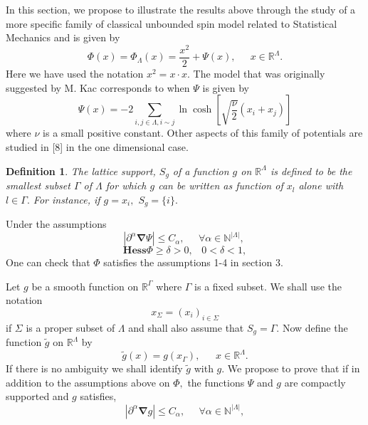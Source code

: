 \documentclass{article}
\newtheorem{definition}[theorem]{Definition}
\begin{document}
In this section, we propose to illustrate the results above through the
study of a more specific family of classical unbounded spin model related to
Statistical Mechanics and is given by%
\begin{equation}
\Phi (x)=\Phi _{\Lambda }(x)=\frac{x^{2}}{2}+\Psi (x),\;\ \ \ \ \;x\in 
\mathbb{R}^{\Lambda }.
\end{equation}%
Here we have used the notation $x^{2}=x\cdot x.$\newline
The model that was originally suggested by M. Kac corresponds to when $\Psi $
is given by%
\begin{equation*}
\Psi (x)=-2\sum_{i,j\in \Lambda ,i\sim j}\ln \cosh \left[ \sqrt{\frac{\nu }{2%
}}\left( x_{i}+x_{j}\right) \right]
\end{equation*}%
where $\nu $ is a small positive constant.\newline
Other aspects of this family of potentials are studied in [8] in the one
dimensional case.

\begin{definition}
The lattice support, $S_{g}$ of a function $g$ on $\mathbb{R}^{\Lambda }$ is
defined to be the smallest subset $\Gamma $ of $\Lambda $ for which $g$ can
be written as function of $x_{l}$ alone with $l\in \Gamma .$ For instance,
if $g=x_{i},$ $S_{g}=\{i\}.$
\end{definition}

Under the assumptions 
\begin{equation}
\left| \partial ^{\alpha }\mathbf{\nabla }\Psi \right| \leq C_{\alpha },\;\
\ \ \ \ \forall \alpha \in \mathbb{N}^{\left| \Lambda \right| },\ 
\end{equation}%
\begin{equation}
\mathbf{Hess}\Phi \geq \delta >0,\;\;\;0<\delta <1,
\end{equation}%
One can check that $\Phi $ satisfies the assumptions 1-4 in section 3.

Let $g$ be a smooth function on $\mathbb{R}^{\Gamma }$ where $\Gamma $ is a
fixed subset. We shall use the notation 
\begin{equation*}
x_{\Sigma }=\left( x_{i}\right) _{i\in \Sigma }
\end{equation*}%
if $\Sigma $ is a proper subset of $\Lambda $ and shall also assume that $%
S_{g}=\Gamma .$ Now define the function $\tilde{g}$ on $\mathbb{R}^{\Lambda
} $ by 
\begin{equation*}
\tilde{g}(x)=g(x_{\Gamma }),\ \ \ \ \ \ \ x\in \mathbb{R}^{\Lambda }.
\end{equation*}%
If there is no ambiguity we shall identify $\tilde{g}$ with $g.$\newline
We propose to prove that if in addition to the assumptions above on $\Phi ,$
the functions $\Psi $ and $g$ are compactly supported and $g$ satisfies,%
\begin{equation*}
\left| \partial ^{\alpha }\mathbf{\nabla }g\right| \leq C_{\alpha },\;\ \ \
\ \ \forall \alpha \in \mathbb{N}^{\left| \Lambda \right| },
\end{equation*}
\end{document}
